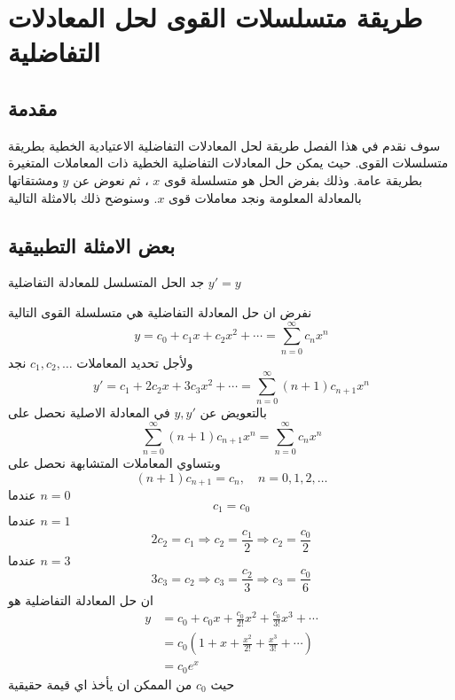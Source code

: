 \chapter{طريقة متسلسلات القوى لحل المعادلات التفاضلية}

\section{مقدمة}
سوف نقدم في هذا الفصل طريقة لحل المعادلات التفاضلية الاعتيادية الخطية  بطريقة متسلسلات القوى. حيث يمكن حل المعادلات التفاضلية الخطية ذات المعاملات المتغيرة بطريقة عامة. وذلك بفرض الحل هو متسلسلة قوى $x$ ، ثم نعوض عن $y$ ومشتقاتها بالمعادلة المعلومة ونجد معاملات قوى $x$. وسنوضح ذلك بالامثلة التالية
\section[بعض الامثلة التطبيقية]{بعض الامثلة التطبيقية \cite{diff_eqs_methods}}

\begin{example}
	جد الحل المتسلسل للمعادلة التفاضلية $y' = y$
\end{example}
\begin{solution}
	نفرض ان حل المعادلة التفاضلية هي متسلسلة القوى التالية
	\[
	y = c_0 + c_1 x + c_2 x^2 + \cdots = \sum_{n=0}^{\infty} c_n x^n
	\]
	ولأجل تحديد المعاملات $c_1,c_2,\dots$ نجد
	\[
	y' = c_1 + 2c_2x + 3c_3 x^2 + \cdots = \sum_{n=0}^{\infty} (n+1)c_{n+1} x^n 
	\]
	بالتعويض عن $y,y'$ في المعادلة الاصلية نحصل على
	\[
	\sum_{n=0}^{\infty} (n+1)c_{n+1} x^n  = \sum_{n=0}^{\infty} c_n x^n
	\]
	وبتساوي المعاملات المتشابهة نحصل على 
	\[
	(n+1)c_{n+1} = c_n , \quad n =0,1,2,\dots 
	\]
	عندما $n=0$ 
	\[
	c_1 = c_0
	\]
	عندما $n=1$ 
	\[
	2c_2 = c_1 \Rightarrow c_2 = \frac{c_1}{2}\Rightarrow c_2 = \frac{c_0}{2}
	\] 
	عندما $n=3$ 
	\[
	3c_3 = c_2 \Rightarrow c_3 = \frac{c_2}{3} \Rightarrow c_3 = \frac{c_0}{6}
	\]
	ان حل المعادلة التفاضلية هو
\begin{align*}
	y &= c_0 + c_0 x + \frac{c_0}{2!} x^2 + \frac{c_0}{3!} x^3 + \cdots\\
	& = c_0 \left(1+x+\frac{x^2}{2!} + \frac{x^3}{3!} + \cdots\right) \\
	&= c_0 e^x
\end{align*}
حيث $c_0$ من الممكن ان يأخذ اي قيمة حقيقية
\end{solution}

